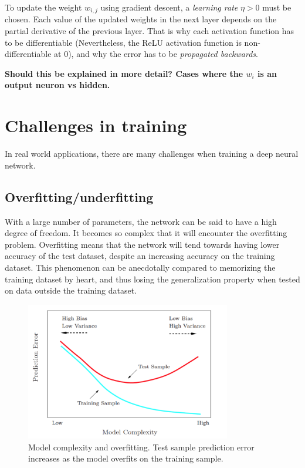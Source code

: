 \documentclass[english, bibtex]{kththesis}
\begin{document}
To update the weight $w_{i,j}$ using gradient descent, a \textit{learning rate} $\eta > 0$ must be chosen. Each value of the updated weights in the next layer depends on the partial derivative of the previous layer. That is why each activation function has to be differentiable (Nevertheless, the ReLU activation function is non-differentiable at 0), and why the error has to be \textit{propagated backwards}. 

\textbf{Should this be explained in more detail? Cases where the $w_i$ is an output neuron vs hidden. }

\section{Challenges in training}

In real world applications, there are many challenges when training a deep neural network.

\subsection{Overfitting/underfitting}

With a large number of parameters, the network can be said to have a high degree of freedom. It becomes so complex that it will encounter the overfitting problem\cite{doi:10.1021/ci0342472}. Overfitting means that the network will tend towards having lower accuracy of the test dataset, despite an increasing accuracy on the training dataset. This phenomenon can be anecdotally compared to memorizing the training dataset by heart, and thus losing the generalization property when tested on data outside the training dataset. 

\begin{figure}[H]
  \begin{center}
    \includegraphics[width=0.8\textwidth]{figures/overfitting.png}
  \end{center}
  \caption{Model complexity and overfitting\cite{Wang_2019}. Test sample prediction error increases as the model overfits on the training sample.}
  \label{fig:overfitting}
\end{figure}
\end{document}
